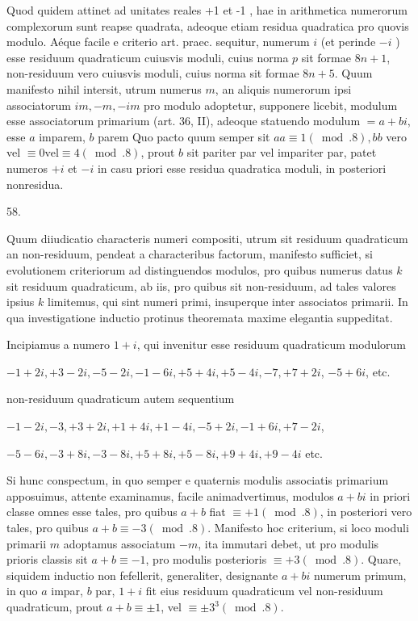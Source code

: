 \documentclass[10pt]{article}
\begin{document}
Quod quidem attinet ad unitates reales +1 et -1 , hae in arithmetica numerorum complexorum sunt reapse quadrata, adeoque etiam residua quadratica pro quovis modulo. Aéque facile e criterio art. praec. sequitur, numerum \(i\) (et perinde \(-i\) ) esse residuum quadraticum cuiusvis moduli, cuius norma \(p\) sit formae \(8 n+1\), non-residuum vero cuiusvis moduli, cuius norma sit formae \(8 n+5\). Quum manifesto nihil intersit, utrum numerus \(m\), an aliquis numerorum ipsi associatorum \(i m,-m,-i m\) pro modulo adoptetur, supponere licebit, modulum esse associatorum primarium (art. 36, II), adeoque statuendo modulum \(=a+b i\), esse \(a\) imparem, \(b\) parem Quo pacto quum semper sit \(a a \equiv 1(\bmod .8), b b\) vero vel \(\equiv 0 \mathrm{vel} \equiv 4(\bmod .8)\), prout \(b\) sit pariter par vel impariter par, patet numeros \(+i\) et \(-i\) in casu priori esse residua quadratica moduli, in posteriori nonresidua.

58.

Quum diiudicatio characteris numeri compositi, utrum sit residuum quadraticum an non-residuum, pendeat a characteribus factorum, manifesto sufficiet, si evolutionem criteriorum ad distinguendos modulos, pro quibus numerus datus \(k\) sit residuum quadraticum, ab iis, pro quibus sit non-residuum, ad tales valores ipsius \(k\) limitemus, qui sint numeri primi, insuperque inter associatos primarii. In qua investigatione inductio protinus theoremata maxime elegantia suppeditat.

Incipiamus a numero \(1+i\), qui invenitur esse residuum quadraticum modulorum

\(-1+2 i,+3-2 i,-5-2 i,-1-6 i,+5+4 i,+5-4 i,-7,+7+2 i\), \(-5+6 i\), etc.

non-residuum quadraticum autem sequentium

\(-1-2 i,-3,+3+2 i,+1+4 i,+1-4 i,-5+2 i,-1+6 i,+7-2 i\),

\(-5-6 i,-3+8 i,-3-8 i,+5+8 i,+5-8 i,+9+4 i,+9-4 i\) etc.

Si hunc conspectum, in quo semper e quaternis modulis associatis primarium apposuimus, attente examinamus, facile animadvertimus, modulos \(a+b i\) in priori classe omnes esse tales, pro quibus \(a+b\) fiat \(\equiv+1(\bmod .8)\), in posteriori vero tales, pro quibus \(a+b \equiv-3(\bmod .8)\). Manifesto hoc criterium, si loco moduli primarii \(m\) adoptamus associatum \(-m\), ita immutari debet, ut pro modulis prioris classis sit \(a+b \equiv-1\), pro modulis posterioris \(\equiv+3(\bmod .8)\). Quare, siquidem inductio non fefellerit, generaliter, designante \(a+b i\) numerum primum, in quo \(a\) impar, \(b\) par, \(1+i\) fit eius residuum quadraticum vel non-residuum quadraticum, prout \(a+b \equiv \pm 1\), vel \(\equiv \pm 3^{3}(\bmod .8)\).
\end{document}
